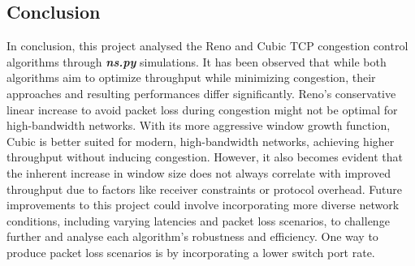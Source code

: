\documentclass[12pt,a4paper]{report}
\begin{document}
\subsection*{Conclusion}
In conclusion, this project analysed the Reno and Cubic TCP congestion control algorithms through \textit{\textbf{ns.py}} simulations. It has been observed that while both algorithms aim to optimize throughput while minimizing congestion, their approaches and resulting performances differ significantly. Reno's conservative linear increase to avoid packet loss during congestion might not be optimal for high-bandwidth networks. With its more aggressive window growth function, Cubic is better suited for modern, high-bandwidth networks, achieving higher throughput without inducing congestion. However, it also becomes evident that the inherent increase in window size does not always correlate with improved throughput due to factors like receiver constraints or protocol overhead. Future improvements to this project could involve incorporating more diverse network conditions, including varying latencies and packet loss scenarios, to challenge further and analyse each algorithm's robustness and efficiency. One way to produce packet loss scenarios is by incorporating a lower switch port rate.
\end{document}
